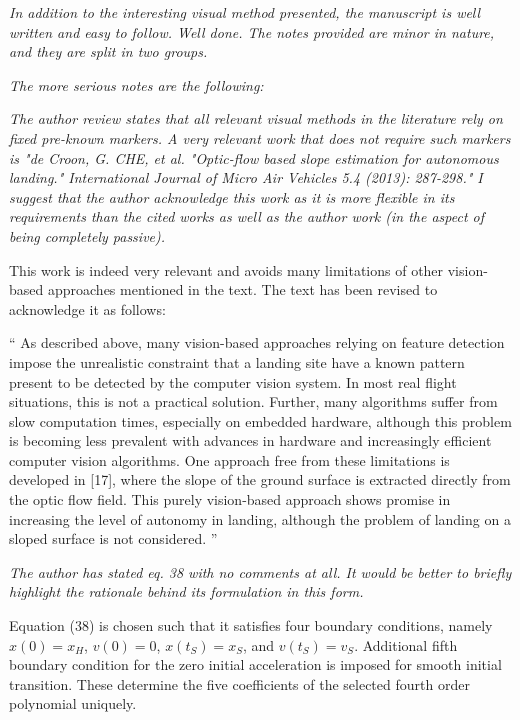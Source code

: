 \documentclass[11pt]{article}
\newenvironment{correction}{\begin{list}{}{\setlength{\leftmargin}{1cm}\setlength{\rightmargin}{1cm}}\vspace{\parsep}\item[]``}{''\end{list}}
\begin{document}
\textit{
In addition to the interesting visual method presented, the manuscript is well written and easy to follow. 
Well done. 
The notes provided are minor in nature, and they are split in two groups.
}

\textit{
The more serious notes are the following:
}

\setlength{\leftmargini}{0pt}
\begin{itemize}\setlength{\itemsep}{2\parsep}

\item 
\textit{The author review states that all relevant visual methods in the literature rely on fixed pre-known markers. A very relevant work that does not require such markers is "de Croon, G. CHE, et al. "Optic-flow based slope estimation for autonomous landing." International Journal of Micro Air Vehicles 5.4 (2013): 287-298." I suggest that the author acknowledge this work as it is more flexible in its requirements than the cited works as well as the author work (in the aspect of being completely passive).
}

This work is indeed very relevant and avoids many limitations of other vision-based approaches mentioned in the text. The text has been revised to acknowledge it as follows:

\begin{correction}
As described above, many vision-based approaches relying on feature detection impose the unrealistic constraint that a landing site have a known pattern present to be detected by the computer vision system. 
In most real flight situations, this is not a practical solution. 
Further, many algorithms suffer from slow computation times, especially on embedded hardware, although this problem is becoming less prevalent with advances in hardware and increasingly efficient computer vision algorithms. 
One approach free from these limitations is developed in [17], where the slope of the ground surface is extracted directly from the optic flow field. 
This purely vision-based approach shows promise in increasing the level of autonomy in landing, although the problem of landing on a sloped surface is not considered.
\end{correction}

\item
\textit{The author has stated eq. 38 with no comments at all. It would be better to briefly highlight the rationale behind its formulation in this form. 
}

Equation (38) is chosen such that it satisfies four boundary conditions, namely $x(0)=x_H$, $v(0)=0$, $x(t_S)=x_S$, and $v(t_S)=v_S$. Additional fifth boundary condition for the zero initial acceleration is imposed for smooth initial transition. These determine the five coefficients of the selected fourth order polynomial uniquely. 


\end{itemize}
\end{document}
